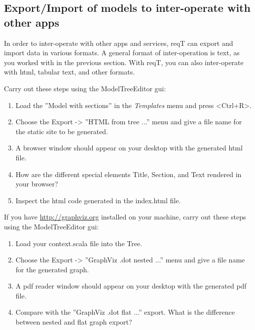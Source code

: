\documentclass[11pt]{article}
\begin{document}
\subsection{Export/Import of models to inter-operate with other apps}

In order to inter-operate with other apps and services, reqT can export and import data in various formats. A general format of inter-operation is text, as you worked with in the previous section. With reqT, you can also inter-operate with html, tabular text, and other formats.

\begin{framed}
\noindent Carry out these steps using the ModelTreeEditor gui:
\begin{enumerate}
\item Load the ''Model with sections'' in the {\it Templates} menu and press <Ctrl+R>.
\item Choose the Export -> ''HTML from tree ...'' menu and give a file name for the static site to be generated.
\item A browser window should appear on your desktop with the generated html file.
\item How are the different special elements Title, Section, and Text rendered in your browser? \newline\newline\underline{\hspace{10cm}}\newline
\item Inspect the html code generated in the index.html file. 
\end{enumerate}
\end{framed}


\begin{framed}
If you have \url{http://graphviz.org} installed on your machine, carry out these steps using the ModelTreeEditor gui:
\begin{enumerate}
\item Load your context.scala file into the Tree.
\item Choose the Export -> ''GraphViz .dot nested ...'' menu and give a file name for the generated graph.
\item A pdf reader window should appear on your desktop with the generated pdf file.
\item Compare with the ''GraphViz .dot flat ...'' export. \newline What is the difference between nested and flat graph export?
\newline\newline\underline{\hspace{10cm}}
\end{enumerate}
\end{framed}
\end{document}
